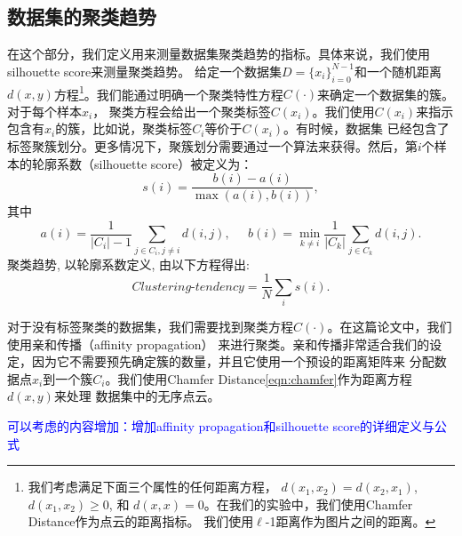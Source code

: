 \documentclass[bachelor, nocolorlinks, printoneside]{seuthesis} %
\newcommand\TODO[1]{\textcolor{blue}{#1}}
\begin{document}
\begin{Main}
\section{数据集的聚类趋势}
\label{sec:metric_on_dataset}
在这个部分，我们定义用来测量数据集聚类趋势的指标。具体来说，我们使用silhouette score\cite{van2015using}来测量聚类趋势。
给定一个数据集$D = \{x_i\}_{i=0}^{N-1}$和一个随机距离$d(x,y)$方程\footnote[1]{我们考虑满足下面三个属性的任何距离方程，
$d(x_1,x_2)=d(x_2,x_1)$, $d(x_1,x_2)\ge 0$, 和 $d(x,x)=0$。在我们的实验中，我们使用Chamfer Distance作为点云的距离指标。
我们使用$\ell$-1距离作为图片之间的距离。}。我们能通过明确一个聚类特性方程$C(\cdot)$来确定一个数据集的簇。对于每个样本$x_i$，
聚类方程会给出一个聚类标签$C(x_i)$。我们使用$C(x_i)$来指示包含有$x_i$的簇，比如说，聚类标签$C_i$等价于$C(x_i)$。有时候，数据集
已经包含了标签聚簇划分。更多情况下，聚簇划分需要通过一个算法来获得。然后，第$i$个样本的轮廓系数（silhouette score）被定义为：
\begin{equation}
    s(i) = \frac{b(i)-a(i)}{\max(a(i),b(i))},
\end{equation}
其中
\begin{equation}
    a(i) = \frac{1}{|C_i|-1}\sum_{j\in C_i, j\neq i}d(i,j),\;\;\;\;\;
    b(i) = \min_{k\neq i}\frac{1}{|C_k|}\sum_{j\in C_k}d(i,j).
\end{equation}
聚类趋势, 以轮廓系数定义, 由以下方程得出:
\begin{equation}
    \textit{Clustering-tendency} = \frac{1}{N}\sum_i s(i).
\end{equation}

对于没有标签聚类的数据集，我们需要找到聚类方程$C(\cdot)$。在这篇论文中，我们使用亲和传播（affinity propagation）\cite{wang2008adaptive}
来进行聚类。亲和传播非常适合我们的设定，因为它不需要预先确定簇的数量，并且它使用一个预设的距离矩阵来
分配数据点$x_i$到一个簇$C_i$。我们使用Chamfer Distance\eqref{eqn:chamfer}作为距离方程$d(x,y)$来处理
数据集中的无序点云。

\TODO{可以考虑的内容增加：增加affinity propagation和silhouette score的详细定义与公式}


\end{Main}
\end{document}
